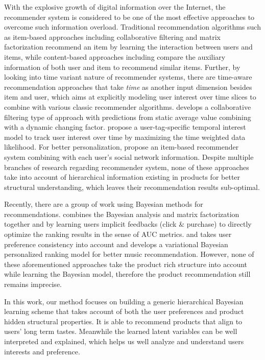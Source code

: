 
With the explosive growth of digital information over the Internet, the recommender system is considered to be one of the most effective approaches to overcome such information overload. Traditional recommendation algorithms such as item-based approaches including collaborative filtering \cite{Sarwar:2001:ICF:371920.372071,Su:2009:SCF:1592474.1722966} and matrix factorization \cite{Rendle:2010:FPM} recommend an item by learning the interaction between users and items, while content-based approaches including \cite{2011rsh..book...73L,Liu:2011,Yuan:2015} compare the auxiliary information of both user and item to recommend similar items. Further, by looking into time variant nature of recommender systems, there are time-aware recommendation approaches \cite{Gultekin_acollaborative,Tang_review:2013} that take \emph{time} as another input dimension besides item and user, which aims at explicitly modeling user interest over time slices to combine with various classic recommender algorithms. \cite{Koren:2010} develops a collaborative filtering type of approach with predictions from static average value combining with a dynamic changing factor.  \cite{Yin:2011} propose a user-tag-specific temporal interest model to track user interest over time by maximizing the time weighted data likelihood.  For better personalization, \cite{Guy:2009} propose an item-based recommender system combining with each user's social network information. Despite multiple branches of research regarding recommender system, none of these approaches take into account of hierarchical information existing in products for better structural understanding, which leaves their recommendation results sub-optimal.  

Recently, there are a group of work using Bayesian methods for recommendations. \cite{rendle2009bpr} combines the Bayesian analysis and matrix factorization together and by learning users implicit feedbacks (click \& purchase) to directly optimize the ranking results in the sense of AUC metrics. \cite{Ben-Elazar:2017} and \cite{zhang2007efficient} takes user preference consistency into account and develops a variational Bayesian personalized ranking model for better music recommendation.  However, none of these aforementioned approaches take the product rich structure into account while learning the Bayesian model, therefore the product recommendation still remains imprecise.  

In this work, our method focuses on building a generic hierarchical Bayesian learning scheme that takes account of both the user preferences and product hidden structural properties. It is able to recommend products that align to users' long term tastes. Meanwhile the learned latent variables can be well interpreted and explained, which helps us well analyze and understand users interests and preference.

